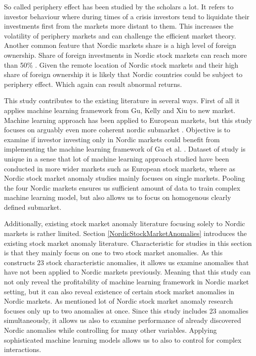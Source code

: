 \documentclass{article}
\begin{document}
So called periphery effect has been studied by the scholars a lot. %
It refers to investor behaviour where during times of a crisis investors tend to liquidate their investments first from the markets more distant to them. This increases the volatility of periphery markets and can challenge the efficient market theory. Another common feature that Nordic markets share is a high level of foreign ownership. Share of foreign investments in Nordic stock markets can reach more than 50\% \footnotemark. Given the remote location of Nordic stock markets and their high share of foreign ownership it is likely that Nordic countries could be subject to periphery effect. Which again can result abnormal returns.

This study contributes to the existing literature in several ways. First of all it applies machine learning framework from Gu, Kelly and Xiu \citeyear{guetal} to new market. Machine learning approach has been applied to European markets, but this study focuses on arguably even more coherent nordic submarket \cite{Drobetz, Fieberg}. Objective is to examine if investor investing only in Nordic markets could benefit from implementing the machine learning framework of Gu et al. \citeyear{guetal}. Dataset of study is unique in a sense that lot of machine learning approach studied have been conducted in more wider markets such as European stock markets, where as Nordic stock market anomaly studies mainly focuses on single markets. Pooling the four Nordic markets ensures us sufficient amount of data to train complex machine learning model, but also allows us to focus on homogenous clearly defined submarket.

Additionally, existing stock market anomaly literature focusing solely to Nordic markets is rather limited. Section \ref{NordicStockMarketAnomalies} introduces the existing stock market anomaly literature. Characteristic for studies in this section is that they mainly focus on one to two stock market anomalies. As this constructs 23 stock characteristic anomalies, it allows us examine anomalies that have not been applied to Nordic markets previously. Meaning that this study can not only reveal the profitability of machine learning framework in Nordic market setting, but it can also reveal existence of certain stock market anomalies in Nordic markets. As mentioned lot of Nordic stock market anomaly research focuses only up to two anomalies at once. Since this study includes 23 anomalies simultaneously, it allows us also to examine performance of already discovered Nordic anomalies while controlling for many other variables. Applying sophisticated machine learning models allows us to also to control for complex interactions.
\end{document}
